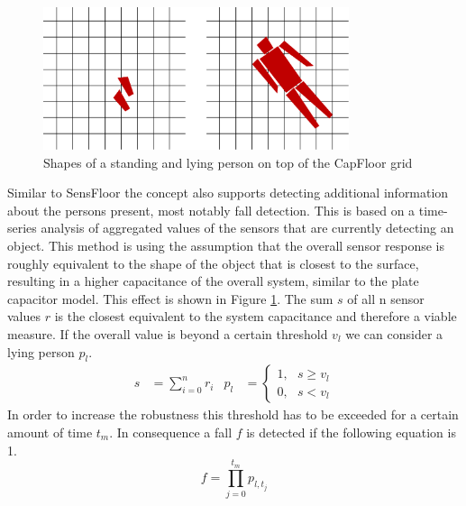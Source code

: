 \begin{figure}[h]
\centering
\includegraphics[width=0.8\textwidth]{images/floor_shapes}
\caption{Shapes of a standing and lying person on top of the CapFloor grid}
\label{fig:capfloor_shapes}
\end{figure}
Similar to SensFloor the concept also supports detecting additional information about the persons present, most notably fall detection. This is based on a time-series analysis of aggregated values of the sensors that are currently detecting an object. This method is using the assumption that the overall sensor response is roughly equivalent to the shape of the object that is closest to the surface, resulting in a higher capacitance of the overall system, similar to the plate capacitor model. This effect is shown in Figure \ref{fig:capfloor_shapes}. The sum $s$ of all n sensor values $r$ is the closest equivalent to the system capacitance and therefore a viable measure. If the overall value is beyond a certain threshold $v_l$ we can consider a lying person $p_l$.
\begin{align}
s&=\sum^n_{i=0}{r_i} & p_l&=\left\{ \begin{array}{c}
1,\ \ \ s\ge v_l \\ 
0,\ \ \ s<v_l \end{array}
\right.
\end{align}
In order to increase the robustness this threshold has to be exceeded for a certain amount of time $t_m$. In consequence a fall $f$ is detected if the following equation is 1.
\begin{equation}
f=\prod^{t_m}_{j=0}{p_{l,t_j}}
\end{equation}